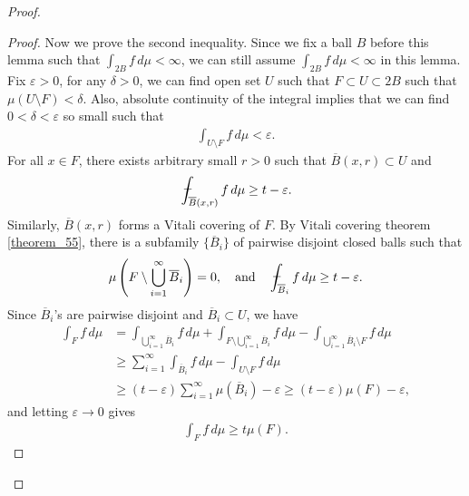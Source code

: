 \documentclass[11pt]{book}
\theoremstyle{definition}
\numberwithin{equation}{chapter}
\def\avint{\,\ThisStyle{\ensurestackMath{%
  \stackinset{c}{.2\LMpt}{c}{1\LMpt}{\SavedStyle-}{\SavedStyle\phantom{\int}}}%
  \setbox0=\hbox{$\SavedStyle\int\,$}\kern-\wd0}\int}
\begin{document}
\begin{proof}
\begin{proof}
Now we prove the second inequality. Since we fix a ball $B$ before this lemma such that $\int_{2B} f\,d\mu < \infty$, we can still assume $\int_{2B} f\,d\mu < \infty$ in this lemma. Fix $\varepsilon > 0$, for any $\delta > 0$, we can find open set $U$ such that $F \subset U \subset 2B$ such that $\mu(U \setminus F) < \delta$. Also, absolute continuity of the integral implies that we can find $0 < \delta < \varepsilon$ so small such that 
\begin{align*}
    \int_{U \setminus F} f\,d\mu < \varepsilon.
\end{align*}
For all $x \in F$, there exists arbitrary small $r > 0$ such that $\overline{B}(x,r) \subset U$ and
\begin{align*}
    \avint_{\overline{B}(x,r)} f\,d\mu \geq t - \varepsilon.
\end{align*}
Similarly, $\overline{B}(x,r)$ forms a Vitali covering of $F$. By Vitali covering theorem \ref{theorem_55}, there is a subfamily $\{\overline{B}_i\}$ of pairwise disjoint closed balls such that
\begin{align*}
    \mu \left(F \setminus \bigcup^\infty_{i=1} \overline{B}_i\right) = 0, \quad \text{and} \quad \avint_{\overline{B}_i} f\,d\mu \geq t - \varepsilon.
\end{align*}
Since $\overline{B}_i$'s are pairwise disjoint and $\overline{B}_i \subset U$, we have
\begin{align*}
    \int_F f\,d\mu & = \int_{\bigcup^\infty_{i=1} \overline{B}_i} f\,d\mu + \int_{F \setminus \bigcup^\infty_{i=1} \overline{B}_i} f\,d\mu - \int_{\bigcup^\infty_{i=1} \overline{B}_i \setminus F} f\,d\mu \\
    & \geq \sum^\infty_{i=1} \int_{\overline{B}_i} f\,d\mu - \int_{U \setminus F} f\,d\mu \\
    & \geq (t - \varepsilon) \sum^\infty_{i=1} \mu(\overline{B}_i) - \varepsilon \geq (t - \varepsilon) \mu(F) - \varepsilon,
\end{align*}
and letting $\varepsilon \to 0$ gives
\begin{align*}
    \int_F f\,d\mu \geq t \mu(F).
\end{align*}
\end{proof}


\end{proof}
\end{document}
